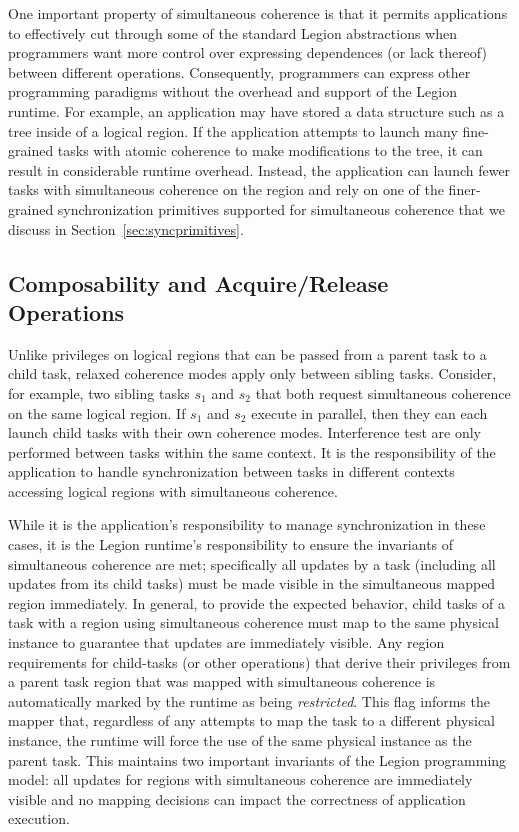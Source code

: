 One important property of simultaneous coherence is that
it permits applications to effectively cut through some
of the standard Legion abstractions when programmers want
more control over expressing dependences (or lack thereof)
between different operations. Consequently, programmers
can express other programming paradigms without
the overhead and support of the Legion runtime. For example, an 
application may have stored a data structure such as a tree 
inside of a logical region. If the application attempts to 
launch many fine-grained tasks with atomic coherence to make 
modifications to the tree, it can result in considerable
runtime overhead. Instead, the application can launch
fewer tasks with simultaneous coherence on the region 
and rely on one of the finer-grained synchronization
primitives supported for simultaneous coherence that 
we discuss in Section~\ref{sec:syncprimitives}.

\subsection{Composability and Acquire/Release Operations}
\label{subsec:relaxedcompose}
Unlike privileges on logical regions that can be passed
from a parent task to a child task, relaxed coherence
modes apply only between sibling tasks. Consider, for
example, two sibling tasks $s_1$ and $s_2$ that both
request simultaneous coherence on the same logical 
region. If $s_1$ and $s_2$ execute in parallel,
then they can each launch child tasks with their own
coherence modes. Interference test are only performed
between tasks within the same context. It is the responsibility
of the application to handle synchronization between
tasks in different contexts accessing logical regions
with simultaneous coherence.

While it is the application's responsibility to manage
synchronization in these cases, it is the Legion 
runtime's responsibility to ensure the invariants of 
simultaneous coherence are met; specifically all updates
by a task (including all updates from its child tasks)
must be made visible in the simultaneous mapped region
immediately. In general, to provide the expected
behavior, child tasks of a task with a region using
simultaneous coherence must map to the same physical
instance to guarantee that updates are immediately
visible. Any region requirements for child-tasks
(or other operations) that derive their privileges
from a parent task region that was mapped with
simultaneous coherence is automatically marked by
the runtime as being {\em restricted}. This flag informs
the mapper that, regardless of any attempts to map the
task to a different physical instance, the runtime will
force the use of the same physical instance as the parent
task. This maintains two important invariants of the
Legion programming model: all updates for regions with
simultaneous coherence are immediately visible and
no mapping decisions can impact the correctness of
application execution. 


